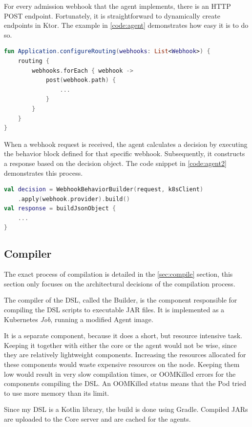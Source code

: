For every admission webhook that the agent implements, there is an HTTP POST endpoint. Fortunately, it is straightforward to dynamically create endpoints in Ktor. The example in \ref{code:agent} demonstrates how easy it is to do so.

\begin{lstlisting}[caption={Dynamically create endpoints},language=Kotlin,label=code:agent]
fun Application.configureRouting(webhooks: List<Webhook>) {
    routing {
        webhooks.forEach { webhook ->
            post(webhook.path) {
                ...
            }
        }
    }
}
\end{lstlisting}

When a webhook request is received, the agent calculates a decision by executing the behavior block defined for that specific webhook. Subsequently, it constructs a response based on the decision object. The code snippet in \ref{code:agent2} demonstrates this process.

\begin{lstlisting}[caption={Make webhook decision},language=Kotlin,label=code:agent2]
val decision = WebhookBehaviorBuilder(request, k8sClient)
    .apply(webhook.provider).build()
val response = buildJsonObject {
    ...
}
\end{lstlisting}

\subsection{Compiler}

The exact process of compilation is detailed in the \ref{sec:compile} section, this section only focuses on the architectural decisions of the compilation process.

The compiler of the DSL, called the Builder, is the component responsible for compiling the DSL scripts to executable JAR files. It is implemented as a Kubernetes \emph{Job}, running a modified Agent image.

It is a separate component, because it does a short, but resource intensive task. Keeping it together with either the core or the agent would not be wise, since they are relatively lightweight components. Increasing the resources allocated for these components would waste expensive resources on the node. Keeping them low would result in very slow compilation times, or OOMKilled errors for the components compiling the DSL. An OOMKilled status means that the Pod tried to use more memory than its limit.

Since my DSL is a Kotlin library, the build is done using Gradle. Compiled JARs are uploaded to the Core server and are cached for the agents.

